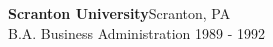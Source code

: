 \textbf{Scranton University}\hfill Scranton, PA\\
B.A. Business Administration \hfill 1989 - 1992\\
\vspace{2mm}